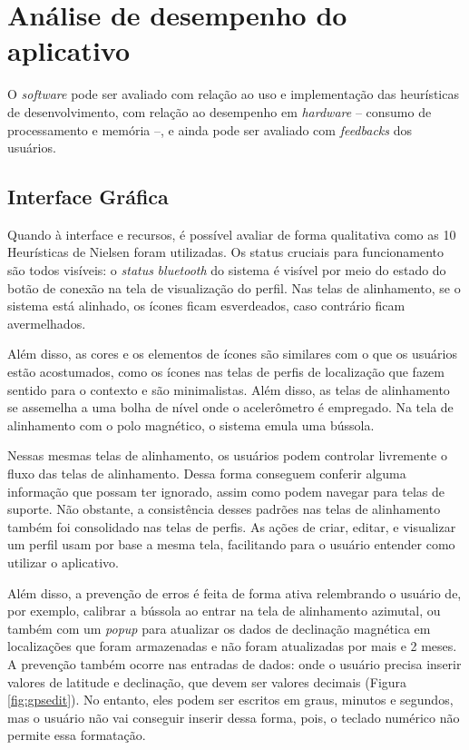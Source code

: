 \section{Análise de desempenho do aplicativo}
O \textit{software} pode ser avaliado com relação ao uso e implementação das heurísticas de desenvolvimento, com relação ao desempenho em \textit{hardware} -- consumo de processamento e memória --, e ainda pode ser avaliado com \textit{feedbacks} dos usuários. 

\subsection{Interface Gráfica}
Quando à interface e recursos, é possível avaliar de forma qualitativa como as 10 Heurísticas de Nielsen foram utilizadas. Os status cruciais para funcionamento são todos visíveis: o \textit{status} \textit{bluetooth} do sistema é visível por meio do estado do botão de conexão na tela de visualização do perfil. Nas telas de alinhamento, se o sistema está alinhado, os ícones ficam esverdeados, caso contrário ficam avermelhados.

Além disso, as cores e os elementos de ícones são similares com o que os usuários estão acostumados, como os ícones nas telas de perfis de localização que fazem sentido para o contexto e são minimalistas. Além disso, as telas de alinhamento se assemelha a uma bolha de nível onde o acelerômetro é empregado. Na tela de alinhamento com o polo magnético, o sistema emula uma bússola. 

Nessas mesmas telas de alinhamento, os usuários podem controlar livremente o fluxo das telas de alinhamento. Dessa forma conseguem conferir alguma informação que possam ter ignorado, assim como podem navegar para telas de suporte. Não obstante, a consistência desses padrões nas telas de alinhamento também foi consolidado nas telas de perfis. As ações de criar, editar, e visualizar um perfil usam por base a mesma tela, facilitando para o usuário entender como utilizar o aplicativo. 

Além disso, a prevenção de erros é feita de forma ativa relembrando o usuário de, por exemplo, calibrar a bússola ao entrar na tela de alinhamento azimutal, ou também com um \textit{popup} para atualizar os dados de declinação magnética em localizações que foram armazenadas e não foram atualizadas por mais e 2 meses. A prevenção também ocorre nas entradas de dados:  onde o usuário precisa inserir valores de latitude e declinação, que devem ser valores decimais (Figura \ref{fig:gpsedit}). No entanto, eles podem ser escritos em graus, minutos e segundos, mas o usuário não vai conseguir inserir dessa forma, pois, o teclado numérico não permite essa formatação.

